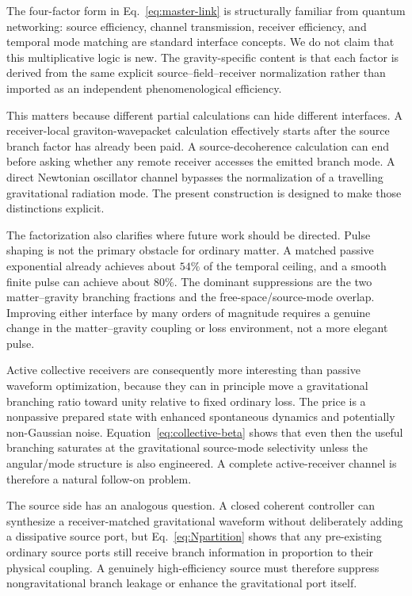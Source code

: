 \documentclass[11pt]{article}
\begin{document}
The four-factor form in Eq.~\eqref{eq:master-link} is structurally familiar from quantum networking: source efficiency, channel transmission, receiver efficiency, and temporal mode matching are standard interface concepts. We do not claim that this multiplicative logic is new. The gravity-specific content is that each factor is derived from the same explicit source--field--receiver normalization rather than imported as an independent phenomenological efficiency.

This matters because different partial calculations can hide different interfaces. A receiver-local graviton-wavepacket calculation effectively starts after the source branch factor has already been paid. A source-decoherence calculation can end before asking whether any remote receiver accesses the emitted branch mode. A direct Newtonian oscillator channel bypasses the normalization of a travelling gravitational radiation mode. The present construction is designed to make those distinctions explicit.

The factorization also clarifies where future work should be directed. Pulse shaping is not the primary obstacle for ordinary matter. A matched passive exponential already achieves about $54\%$ of the temporal ceiling, and a smooth finite pulse can achieve about $80\%$. The dominant suppressions are the two matter--gravity branching fractions and the free-space/source-mode overlap. Improving either interface by many orders of magnitude requires a genuine change in the matter--gravity coupling or loss environment, not a more elegant pulse.

Active collective receivers are consequently more interesting than passive waveform optimization, because they can in principle move a gravitational branching ratio toward unity relative to fixed ordinary loss. The price is a nonpassive prepared state with enhanced spontaneous dynamics and potentially non-Gaussian noise. Equation~\eqref{eq:collective-beta} shows that even then the useful branching saturates at the gravitational source-mode selectivity unless the angular/mode structure is also engineered. A complete active-receiver channel is therefore a natural follow-on problem.

The source side has an analogous question. A closed coherent controller can synthesize a receiver-matched gravitational waveform without deliberately adding a dissipative source port, but Eq.~\eqref{eq:Npartition} shows that any pre-existing ordinary source ports still receive branch information in proportion to their physical coupling. A genuinely high-efficiency source must therefore suppress nongravitational branch leakage or enhance the gravitational port itself.
\end{document}

